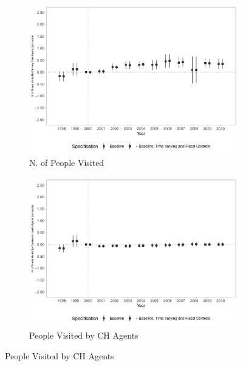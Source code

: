 \begin{figure}[h!]
    \begin{center}
    \caption{Effects on Primary Care Coverage - Intensive Margin}\label{fig:12}
    \begin{subfigure}{0.32\textwidth}
        \caption{\scriptsize N. of People Visited}\label{fig:12a}
        \centering
        \includegraphics[width=\textwidth]{plots/siab_accomp_especif_pcapita_dist_ec29_baseline_dist_ec29_baseline_12.pdf}
    \end{subfigure}
    \begin{subfigure}{0.32\textwidth}
        \centering
        \caption{\scriptsize People Visited by CH Agents}\label{fig:12b}
        \includegraphics[width=\textwidth]{plots/siab_accomp_especif_pacs_pcapita_dist_ec29_baseline_dist_ec29_baseline_12.pdf}

\end{subfigure}
\end{center}
\end{figure}

